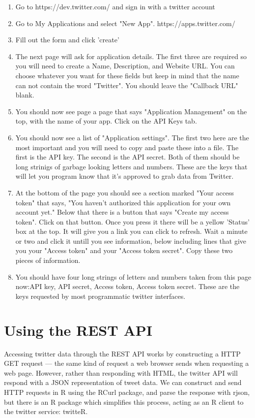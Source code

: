 \documentclass{article}\usepackage[]{graphicx}\usepackage[]{color}
\begin{document}
\begin{enumerate}
  \item Go to https://dev.twitter.com/ and sign in with a twitter account
  \item Go to My Applications and select "New App". https://apps.twitter.com/
  \item Fill out the form and click 'create'
  \item The next page will ask for application details. The first three are required so you will need to create a Name, Description, and Website URL. You can choose whatever you want for these fields but keep in mind that the name can not contain the word "Twitter". You should leave the "Callback URL" blank. 
  \item You should now see page a page that says "Application Management" on the top, with the name of your app. Click on the API Keys tab.
  \item You should now see a list of "Application settings". The first two here are the most important and you will need to copy and paste these into a file. The first is the API key. The second is the API secret. Both of them should be long strinigs of garbage looking letters and numbers. These are the keys that will let you program know that it's approved to grab data from Twitter.
  \item At the bottom of the page you should see a section marked "Your access token" that says, "You haven't authorized this application for your own account yet." Below that there is a button that says "Create my access token". Click on that button. Once you press it there will be a yellow 'Status' box at the top. It will give you a link you can click to refresh. Wait a minute or two and click it untill you see information, below including lines that give you your "Access token" and your "Access token secret". Copy these two pieces of information.
  \item You should have four long strings of letters and numbers taken from this page now:API key, API secret, Access token, Access token secret. These are the keys requested by most programmatic twitter interfaces.
\end{enumerate}


\section*{Using the REST API}

Accessing twitter data through the REST API works by constructing a HTTP GET request --- the same kind of request a web browser sends when requesting a web page. However, rather than responding with HTML, the twitter API will respond with a JSON representation of tweet data. We can construct and send HTTP requests in R using the RCurl package, and parse the response with rjson, but there is an R package which simplifies this process, acting as an R client to the twitter service: twitteR.
\end{document}
